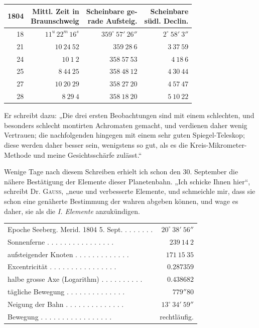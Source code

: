 \begin{center}
\begingroup\fontsize{9}{11}\selectfont\setlength{\tabcolsep}{3pt}\renewcommand{\arraystretch}{1.12}
\begin{tabular}{r|r|r|r}
1804 & \shortstack{Mittl. Zeit in\\Braunschweig} & \shortstack{Scheinbare ge-\\rade Aufsteig.} & \shortstack{Scheinbare\\südl. Declin.} \\ \hline
18 & $11^{u}\,22^{m}\,16^{s}$ & $359^\circ\ 57'\ 26''$ & $2^\circ\ 58'\ 3''$ \\
21 & $10\ 24\ 52$ & $359\ 28\ 6$ & $3\ 37\ 59$ \\
24 & $10\ 1\ 2$ & $358\ 57\ 53$ & $4\ 18\ 6$ \\
25 & $8\ 44\ 25$ & $358\ 48\ 12$ & $4\ 30\ 44$ \\
27 & $10\ 20\ 29$ & $358\ 27\ 20$ & $4\ 57\ 47$ \\
28 & $8\ 29\ 4$ & $358\ 18\ 20$ & $5\ 10\ 22$ \\
\end{tabular}\endgroup
\end{center}

Er schreibt dazu: „Die drei ersten Beobachtungen sind mit einem schlechten, und
besonders schlecht montirten Achromaten gemacht, und verdienen daher wenig Vertrauen;
die nachfolgenden hingegen mit einem sehr guten Spiegel-Teleskop; diese werden daher
besser sein, wenigstens so gut, als es die Kreis-Mikrometer-Methode und meine
Gesichtsschärfe zulässt.“

Wenige Tage nach diesem Schreiben erhielt ich schon den 30. September die nähere
Bestätigung der Elemente dieser Planetenbahn. „Ich schicke Ihnen hier“, schreibt
Dr. \textsc{Gauss}, „neue und verbesserte Elemente, und schmeichle mir, dass sie schon eine
genäherte Bestimmung der wahren abgeben können, und wage es daher, sie als die
\textit{I. Elemente} anzukündigen.

\begin{center}
\begingroup\fontsize{9}{11}\selectfont\setlength{\tabcolsep}{3pt}
\begin{tabular}{lr}
Epoche Seeberg. Merid. 1804 5. Sept. . . . . . . . & $20^\circ\ 38'\ 56''$ \\
Sonnenferne . . . . . . . . . . . . . . . . & $239\ 14\ 2$ \\
aufsteigender Knoten . . . . . . . . . . . . . & $171\ 15\ 35$ \\
Excentricität . . . . . . . . . . . . . . . . & $0.287359$ \\
halbe grosse Axe (Logarithm) . . . . . . . . . . & $0.438682$ \\
tägliche Bewegung . . . . . . . . . . . . . . & $779''80$ \\
Neigung der Bahn . . . . . . . . . . . . . . & $13^\circ\ 34'\ 59''$ \\
Bewegung . . . . . . . . . . . . . . . . . & rechtläufig. \\
\end{tabular}\endgroup
\end{center}

